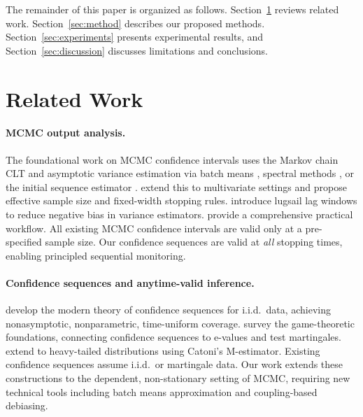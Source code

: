 \documentclass[11pt]{article}
\begin{document}
The remainder of this paper is organized as follows. Section~\ref{sec:related} reviews related work. Section~\ref{sec:method} describes our proposed methods. Section~\ref{sec:experiments} presents experimental results, and Section~\ref{sec:discussion} discusses limitations and conclusions.

\section{Related Work}
\label{sec:related}

\paragraph{MCMC output analysis.}
The foundational work on MCMC confidence intervals uses the Markov chain CLT and asymptotic variance estimation via batch means \citep{flegal2010batch}, spectral methods \citep{geyer1992practical}, or the initial sequence estimator \citep{geyer2011introduction}. \citet{vats2019multivariate} extend this to multivariate settings and propose effective sample size and fixed-width stopping rules. \citet{vats2022lugsail} introduce lugsail lag windows to reduce negative bias in variance estimators. \citet{flegal2024implementing} provide a comprehensive practical workflow. All existing MCMC confidence intervals are valid only at a pre-specified sample size. Our confidence sequences are valid at \emph{all} stopping times, enabling principled sequential monitoring.

\paragraph{Confidence sequences and anytime-valid inference.}
\citet{howard2021time} develop the modern theory of confidence sequences for i.i.d.\ data, achieving nonasymptotic, nonparametric, time-uniform coverage. \citet{ramdas2023game} survey the game-theoretic foundations, connecting confidence sequences to e-values and test martingales. \citet{wang2023catoni} extend to heavy-tailed distributions using Catoni's M-estimator. Existing confidence sequences assume i.i.d.\ or martingale data. Our work extends these constructions to the dependent, non-stationary setting of MCMC, requiring new technical tools including batch means approximation and coupling-based debiasing.
\end{document}

